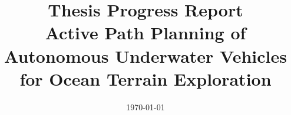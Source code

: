 \documentclass[a4paper, 11pt, oneside]{Thesis}  %
\begin{document}
\frontmatter      %

\title  {Thesis Progress Report \\ \textnormal{Active Path Planning of Autonomous Underwater Vehicles for Ocean Terrain Exploration}}
\addresses  {\groupname\\\deptname\\\univname}  %
\date       {\today}
\subject    {}
\keywords   {}

\maketitle


\fancyhead{}  %
\rhead{\thepage}  %
\lhead{}  %

\pagestyle{fancy}  %
\end{document}
